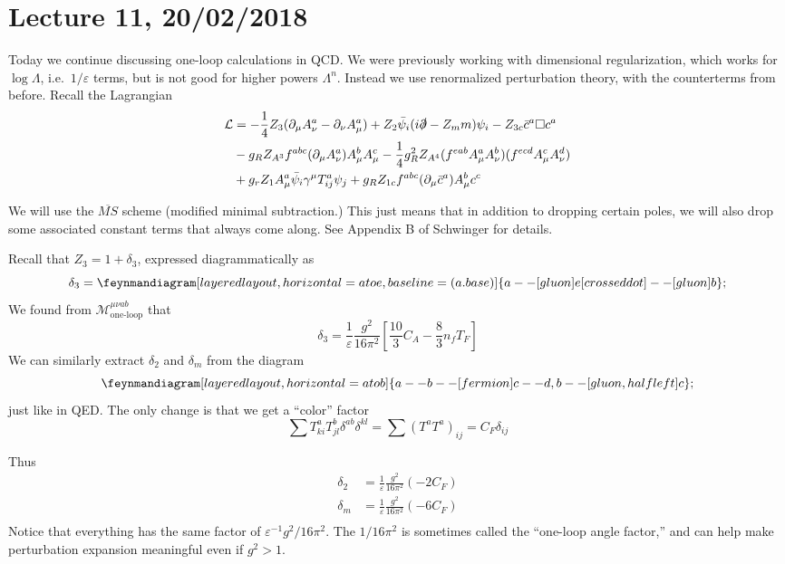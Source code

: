 \section*{Lecture 11, 20/02/2018}
Today we continue discussing one-loop calculations in QCD.
We were previously working with dimensional regularization, which works for $\log \Lambda$, i.e.~$1/\varepsilon$ terms, but is not good for higher powers $\Lambda^n$.
Instead we use renormalized perturbation theory, with the counterterms from before.
Recall the Lagrangian
\begin{align*}
\mathcal L &= -\frac{1}{4}Z_3 (\partial_\mu A_\nu^a - \partial_\nu A_\mu^a) + Z_2 \bar \psi_i(i \slashed \partial - Z_m m) \psi_i - Z_{3c} \bar c^a \square c^a \\
&- g_R Z_{A^3} f^{abc} (\partial_\mu A_\nu^a) A_\mu^b A_\mu^c - \frac{1}{4} g_R^2 Z_{A^4} (f^{eab} A^a_\mu A^b_\nu)(f^{ecd} A_\mu^c A_\nu^d)\\
&+g_r Z_1 A_\mu^a \bar \psi_i \gamma^\mu T_{ij}^a \psi_j + g_R Z_{1c} f^{abc} (\partial_\mu \bar c^a)A_\mu^b c^c
\end{align*}

We will use the $\overline{MS}$ scheme (modified minimal subtraction.)
This just means that in addition to dropping certain poles, we will also drop some associated constant terms that always come along.
See Appendix B of Schwinger for details.

Recall that $Z_3 = 1 + \delta_3$, expressed diagrammatically as
\[
\delta_3 = \feynmandiagram [layered layout, horizontal = a to e, baseline = (a.base)]{
    a -- [gluon] e [crossed dot] -- [gluon] b
};
\]
We found from $\mathcal M ^{\mu \nu a b}_{\text{one-loop}}$ that
\[
\delta_3 = \frac{1}{\varepsilon}\frac{g^2}{16 \pi^2}\left[ \frac{10}{3}C_A - \frac{8}{3} n_f T_F \right]
\]
We can similarly extract $\delta_2$ and $\delta_m$ from the diagram
\[
\feynmandiagram [layered layout, horizontal = a to b]{
    a -- b -- [fermion] c -- d,
    b -- [gluon, half left] c
};
\]
just like in QED.
The only change is that we get a ``color'' factor
\[
\sum T_{ki}^a T_{jl}^b \delta^{ab} \delta^{kl} = \sum (T^a T^a)_{ij} = C_F \delta_{ij}
\]

Thus
\begin{align*}
\delta_2 &= \frac{1}{\varepsilon}\frac{g^2}{16 \pi^2}(-2 C_F)\\
\delta_m &= \frac{1}{\varepsilon}\frac{g^2}{16 \pi^2}(-6 C_F)\\
\end{align*}
Notice that everything has the same factor of $\varepsilon^{-1} g^2 /16 \pi^2$.
The $1/16 \pi^2$ is sometimes called the ``one-loop angle factor,'' and can help make perturbation expansion meaningful even if $g^2 > 1$.

